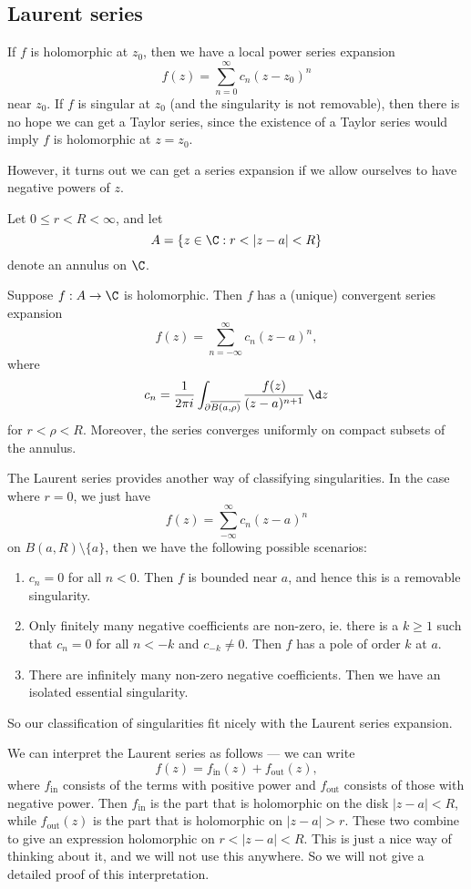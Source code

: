 \documentclass[a4paper]{article}
\begin{document}
\subsection{Laurent series}
If $f$ is holomorphic at $z_0$, then we have a local power series expansion
\[
  f(z) = \sum_{n = 0}^\infty c_n (z - z_0)^n
\]
near $z_0$. If $f$ is singular at $z_0$ (and the singularity is not removable), then there is no hope we can get a Taylor series, since the existence of a Taylor series would imply $f$ is holomorphic at $z = z_0$.

However, it turns out we can get a series expansion if we allow ourselves to have negative powers of $z$.

\begin{thm}
  Let $0 \leq r < R < \infty$, and let
  \[
    A = \{z \in \C: r < |z - a| < R\}
  \]
  denote an annulus on $\C$.

  Suppose $f: A \to \C$ is holomorphic. Then $f$ has a (unique) convergent series expansion
  \[
    f(z) = \sum_{n = -\infty}^\infty c_n (z - a)^n,
  \]
  where
  \[
    c_n = \frac{1}{2\pi i} \int_{\partial \overline{B(a, \rho)}} \frac{f(z)}{(z - a)^{n + 1}}\;\d z
  \]
  for $r < \rho < R$. Moreover, the series converges uniformly on compact subsets of the annulus.
\end{thm}

The Laurent series provides another way of classifying singularities. In the case where $r = 0$, we just have
\[
  f(z) = \sum_{-\infty}^\infty c_n (z - a)^n
\]
on $B(a, R) \setminus \{a\}$, then we have the following possible scenarios:
\begin{enumerate}
  \item $c_n = 0$ for all $n < 0$. Then $f$ is bounded near $a$, and hence this is a removable singularity.
  \item Only finitely many negative coefficients are non-zero, ie. there is a $k \geq 1$ such that $c_n = 0$ for all $n < -k$ and $c_{-k} \not= 0$. Then $f$ has a pole of order $k$ at $a$.
  \item There are infinitely many non-zero negative coefficients. Then we have an isolated essential singularity.
\end{enumerate}
So our classification of singularities fit nicely with the Laurent series expansion.

We can interpret the Laurent series as follows --- we can write
\[
  f(z) = f_{\mathrm{in}}(z) + f_{\mathrm{out}}(z),
\]
where $f_{\mathrm{in}}$ consists of the terms with positive power and $f_{\mathrm{out}}$ consists of those with negative power. Then $f_{\mathrm{in}}$ is the part that is holomorphic on the disk $|z - a| < R$, while $f_{\mathrm{out}}(z)$ is the part that is holomorphic on $|z - a| > r$. These two combine to give an expression holomorphic on $r < |z - a| < R$. This is just a nice way of thinking about it, and we will not use this anywhere. So we will not give a detailed proof of this interpretation.
\end{document}

